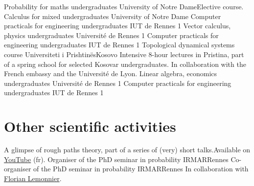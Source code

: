 \documentclass[11pt,classic]{moderncv}
\begin{document}
   {Probability for maths undergraduates}
   {University of Notre Dame}{}{}{Elective course.}
   {Calculus for mixed undergraduates}
   {University of Notre Dame}{}{}{}
   {Computer practicals for engineering undergraduates}
   {IUT de Rennes 1}{}{}{}
   {Vector calculus, physics undergraduates}
   {Université de Rennes 1}{}{}{}
\cventry{         }
   {Computer practicals for engineering undergraduates}
   {IUT de Rennes 1}{}{}{}
   {Topological dynamical systems course}
   {Universiteti i Prishtinës}{Kosovo}{}
   {Intensive 8-hour lectures in Pristina, part of a spring school for selected Kosovar undergraduates. In collaboration with the French embassy and the Université de Lyon.}
   {Linear algebra, economics undergraduates}
   {Université de Rennes 1}{}{}{}
   {Computer practicals for engineering undergraduates}
   {IUT de Rennes 1}{}{}{}

\section{Other scientific activities}

   {A glimpse of rough paths theory, part of a series of (very) short talks.\newline Available on \href{https://youtu.be/r31qisjgbK8}{YouTube} (fr).}
   {Organiser of the PhD seminar in probability}
   {IRMAR}{Rennes}{}
   {}
   {Co-organiser of the PhD seminar in probability}
   {IRMAR}{Rennes}{}
   {In collaboration with \href{http://perso.eleves.ens-rennes.fr/people/florian.lemonnier/}{Florian Lemonnier}.}
\end{document}
